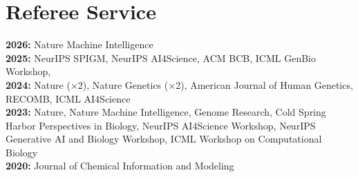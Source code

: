 \documentclass[11pt]{article}
\begin{document}
\section*{\textcolor{Mahogany}{Referee Service}}
{\small
\textbf{2026:} Nature Machine Intelligence\\
\textbf{2025:} NeurIPS SPIGM, NeurIPS AI4Science, ACM BCB, ICML GenBio Workshop, \\
\textbf{2024:} Nature (×2), Nature Genetics (×2), American Journal of Human Genetics, RECOMB, ICML AI4Science\\
\textbf{2023:} Nature, Nature Machine Intelligence, Genome Research, Cold Spring Harbor Perspectives in Biology, NeurIPS AI4Science Workshop, NeurIPS Generative AI and Biology Workshop, ICML Workshop on Computational Biology\\
\textbf{2020:} Journal of Chemical Information and Modeling
}
\end{document}
